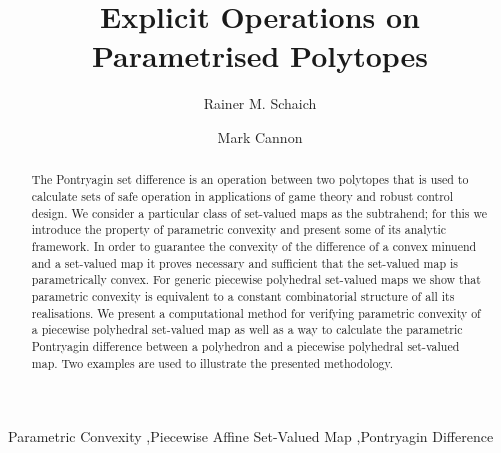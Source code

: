 \documentclass{elsarticle}
\theoremstyle{remark}
\theoremstyle{definition}
\begin{document}
\begin{frontmatter}

\title{Explicit Operations on Parametrised Polytopes}

\author{Rainer M. Schaich}

\author{Mark Cannon}



\address{Department of Engineering Science, University of Oxford, Parks Road, OX1 3PJ, Oxford}


\begin{abstract}
The Pontryagin set difference is an operation between two polytopes that is used to calculate sets of safe operation in applications of game theory and robust control design.
%
We consider a particular class of set-valued maps as the subtrahend; for this we introduce the property of parametric convexity and present some of its analytic framework.
%
In order to guarantee the convexity of the difference of a convex minuend and a set-valued map it proves necessary and sufficient that the set-valued map is parametrically convex.
%
For generic piecewise polyhedral set-valued maps we show that parametric convexity is equivalent to a constant combinatorial structure of all its realisations.
%
We present a computational method for verifying parametric convexity of a piecewise polyhedral set-valued map as well as a way to calculate the parametric Pontryagin difference between a polyhedron and a piecewise polyhedral set-valued map.
%
Two examples are used to illustrate the presented methodology.
\end{abstract}

\begin{keyword}
Parametric Convexity \sep Piecewise Affine Set-Valued Map \sep Pontryagin Difference
\end{keyword}

\end{frontmatter}

\end{document}
